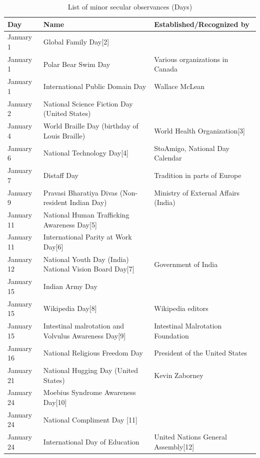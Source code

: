 \documentclass[
  openany]{book}
\begin{document}
\begin{longtable}[t]{>{\raggedright\arraybackslash}p{8em}>{\raggedright\arraybackslash}p{20em}>{\raggedright\arraybackslash}p{12em}}
\caption{\label{tab:day-observances}List of minor secular observances (Days)}\\
\toprule
Day & Name & Established/Recognized by\\
\midrule
\rowcolor{gray!6}  January 1 & Global Family Day[2] & \\
January 1 & Polar Bear Swim Day & Various organizations in Canada\\
\rowcolor{gray!6}  January 1 & International Public Domain Day & Wallace McLean\\
January 2 & National Science Fiction Day (United States) & \\
\rowcolor{gray!6}  January 4 & World Braille Day (birthday of Louis Braille) & World Health Organization[3]\\
\addlinespace
January 6 & National Technology Day[4] & StoAmigo, National Day Calendar\\
\rowcolor{gray!6}  January 7 & Distaff Day & Tradition in parts of Europe\\
January 9 & Pravasi Bharatiya Divas (Non-resident Indian Day) & Ministry of External Affairs (India)\\
\rowcolor{gray!6}  January 11 & National Human Trafficking Awareness Day[5] & \\
January 11 & International Parity at Work Day[6] & \\
\addlinespace
January 12 & National Youth Day (India)
\rowcolor{gray!6}  National Vision Board Day[7] & Government of India\\
January 15 & Indian Army Day & \\
\rowcolor{gray!6}  January 15 & Wikipedia Day[8] & Wikipedia editors\\
January 15 & Intestinal malrotation and Volvulus Awareness Day[9] & Intestinal Malrotation Foundation\\
\rowcolor{gray!6}  January 16 & National Religious Freedom Day & President of the United States\\
\addlinespace
January 21 & National Hugging Day (United States) & Kevin Zaborney\\
\rowcolor{gray!6}  January 24 & Moebius Syndrome Awareness Day[10] & \\
January 24 & National Compliment Day [11] & \\
\rowcolor{gray!6}  January 24 & International Day of Education & United Nations General Assembly[12]\\

\end{longtable}
\end{document}
